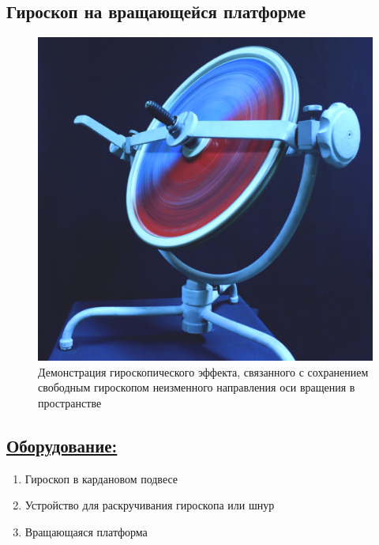\documentclass[14pt,a4paper,oneside]{extarticle}	%
\begin{document}
	
	
	\begin{center}
		\subsection*{Гироскоп на вращающейся платформе}
	\end{center}
	
	\begin{figure}[H] 	
		\centering 	
		\includegraphics[width=0.75\linewidth]{gyro-1.png}
		\caption{Демонстрация гироскопического эффекта, связанного с сохранением свободным гироскопом неизменного направления оси вращения в пространстве}
		\label{gyro-1}
	\end{figure}
	
	\subsection*{\underline{Оборудование:}}

			\begin{enumerate} 
			\item Гироскоп в кардановом подвесе
			\item Устройство для раскручивания гироскопа или шнур
			\item Вращающаяся платформа
		\end{enumerate}
\end{document}
